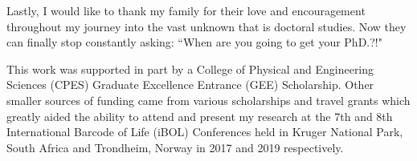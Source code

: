 \begin{acknowledgements}
\vspace{5mm}

\noindent Lastly, I would like to thank my family for their love and encouragement throughout my journey into the vast unknown that is doctoral studies. Now they can finally stop constantly asking: ``When are you going to get your PhD.?!"

\vspace{5mm}

\noindent This work was supported in part by a College of Physical and Engineering Sciences (CPES) Graduate Excellence Entrance (GEE) Scholarship. Other smaller sources of funding came from various scholarships and travel grants which greatly aided the ability to attend and present my research at the 7th and 8th International Barcode of Life (iBOL) Conferences held in Kruger National Park, South Africa and Trondheim, Norway in 2017 and 2019 respectively.


\end{acknowledgements}
\dsp
